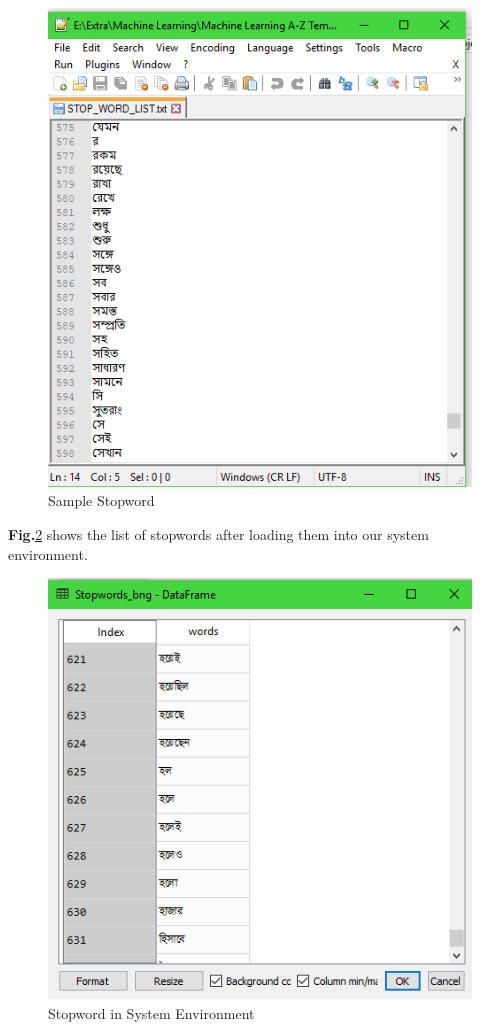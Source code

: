 \documentclass[12pt,a4paper]{report}
\begin{document}
\begin{figure}[h!]
    \centering
    \includegraphics[scale=0.55]{Figures/stp_wrd.PNG}
    \caption{Sample Stopword}
    \label{fig:stpw}
\end{figure}
\par\noindent

\textbf{Fig.}\ref{fig:lstpw} shows the list of stopwords after loading them into our system environment.
\begin{figure}[h!]
    \centering
    \includegraphics[scale=0.6]{Figures/lstp_wrd.PNG}
    \caption{Stopword in System Environment}
    \label{fig:lstpw}
\end{figure}
\end{document}
